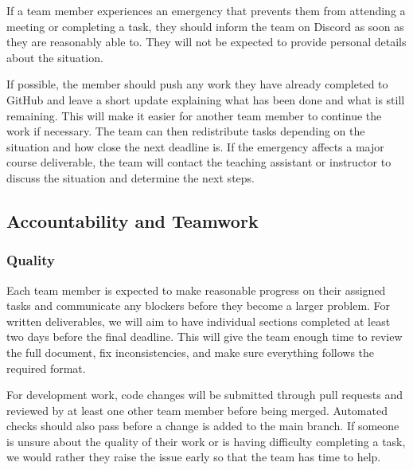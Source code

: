 \documentclass{article}
\begin{document}
If a team member experiences an emergency that prevents them from attending a
meeting or completing a task, they should inform the team on Discord as soon as
they are reasonably able to. They will not be expected to provide personal
details about the situation.

\bigskip
If possible, the member should push any work they have already completed to
GitHub and leave a short update explaining what has been done and what is still
remaining. This will make it easier for another team member to continue the work
if necessary. The team can then redistribute tasks depending on the situation
and how close the next deadline is. If the emergency affects a major course
deliverable, the team will contact the teaching assistant or instructor to
discuss the situation and determine the next steps.

\subsection*{Accountability and Teamwork}

\subsubsection*{Quality} 


    Each team member is expected to make reasonable progress on their assigned tasks
    and communicate any blockers before they become a larger problem. For written
    deliverables, we will aim to have individual sections completed at least two
    days before the final deadline. This will give the team enough time to review
    the full document, fix inconsistencies, and make sure everything follows the
    required format.

    \bigskip
    For development work, code changes will be submitted through pull requests and
    reviewed by at least one other team member before being merged. Automated checks
    should also pass before a change is added to the main branch. If someone is
    unsure about the quality of their work or is having difficulty completing a
    task, we would rather they raise the issue early so that the team has time to
    help.
\end{document}
